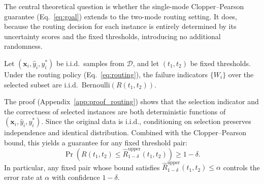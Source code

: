 The central theoretical question is whether the single-mode Clopper–Pearson guarantee (Eq.~\ref{eq:goal}) extends to the two-mode routing setting. It does, because the routing decision for each instance is entirely determined by its uncertainty scores and the fixed thresholds, introducing no additional randomness.

\begin{lemma}
\label{lem:routing}
Let $(\mathbf{x}_i, \hat{y}_i, y^*_i)$ be i.i.d.\ samples from $\mathcal{D}$, and let $(t_1, t_2)$ be fixed thresholds. Under the routing policy (Eq.~\ref{eq:routing}), the failure indicators $\{W_i\}$ over the selected subset are i.i.d.\ $\mathrm{Bernoulli}(R(t_1, t_2))$.
\end{lemma}

\noindent The proof (Appendix~\ref{app:proof_routing}) shows that the selection indicator and the correctness of selected instances are both deterministic functions of $(\mathbf{x}_i, \hat{y}_i, y^*_i)$. Since the original data is i.i.d., conditioning on selection preserves independence and identical distribution. Combined with the Clopper--Pearson bound, this yields a guarantee for any fixed threshold pair:
\begin{equation}
\label{eq:guarantee_route}
  \boxed{\;\Pr\!\left(R(t_1, t_2) \leq \hat{R}^{\mathrm{upper}}_{1-\delta}(t_1, t_2)\right) \geq 1 - \delta.\;}
\end{equation}
In particular, any fixed pair whose bound satisfies $\hat{R}^{\mathrm{upper}}_{1-\delta}(t_1,t_2) \leq \alpha$ controls the error rate at $\alpha$ with confidence $1-\delta$. 

